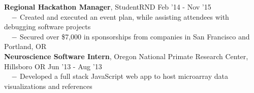 \documentclass[10.75pt]{article}
\newcommand{\sectionNL}{\\[2pt]}
\newcommand{\customtab}{$\hspace{10pt} - \hspace{2pt}$}
\newcommand{\customtabinline}{$\hspace{23pt}$}
\begin{document}
\begin{tabbing}
	\textbf{Regional Hackathon Manager}, StudentRND \>Feb '14 - Nov '15 \\
	\customtab Created and executed an event plan, while assisting attendees with debugging software projects \\
	\customtab Secured over \$7,000 in sponsorships from companies in San Francisco and Portland, OR \\
	
	
	\textbf{Neuroscience Software Intern}, Oregon National Primate Research Center, Hillsboro OR \> Jun '13 - Aug '13 \\
	\customtab Developed a full stack JavaScript web app to host microarray data visualizations and references \\
\end{tabbing}


	
\end{document}
